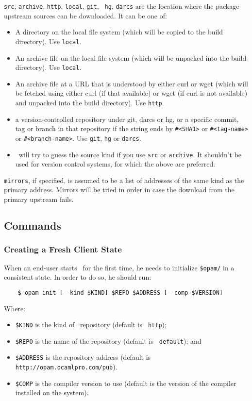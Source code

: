 \documentclass[a4paper,10pt]{article}
\begin{document}
{\tt src}, {\tt archive}, {\tt http}, {\tt local}, {\tt git}, {\tt
  hg}, {\tt darcs} are the location where the package upstream sources
can be downloaded. It can be one of:

\begin{itemize}
\item A directory on the local file system (which will be copied to
  the build directory). Use {\tt local}.
\item An archive file on the local file system (which will be unpacked
  into the build directory). Use {\tt local}.
\item An archive file at a URL that is understood by either curl or
  wget (which will be fetched using either curl (if that available) or
  wget (if curl is not available) and unpacked into the build
  directory). Use {\tt http}.
\item a version-controlled repository under git, darcs or
  hg, or a specific commit, tag or branch in that repository if
  the string ends by \verb+#<SHA1>+ or \verb+#<tag-name>+ or
  \verb+#<branch-name>+. Use {\tt git}, {\tt hg} or {\tt darcs}.
\item \OPAM\ will try to guess the source kind if you use {\tt src} or
  {\tt archive}. It shouldn't be used for version control systems, for
  which the above are preferred.
\end{itemize}

{\tt mirrors}, if specified, is assumed to be a list of addresses of the same
kind as the primary address. Mirrors will be tried in order in case the download
from the primary upstream fails.

\subsection{Commands}

\subsubsection{Creating a Fresh Client State}
\label{opam-init}

When an end-user starts \OPAM\ for the first time, he needs to
initialize \verb+$opam/+ in a consistent state. In order to do so, he
should run:

\begin{verbatim}
    $ opam init [--kind $KIND] $REPO $ADDRESS [--comp $VERSION]
\end{verbatim}

Where:
\begin{itemize}
\item \verb+$KIND+ is the kind of \OPAM\ repository (default is {\tt
  http});
\item \verb+$REPO+ is the name of the repository (default is {\tt
  default}); and
\item \verb+$ADDRESS+ is the repository address (default is
  \verb+http://opam.ocamlpro.com/pub+).
\item \verb+$COMP+ is the compiler version to use (default is the
  version of the compiler installed on the system).
\end{itemize}
\end{document}
